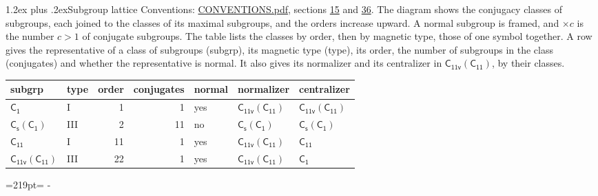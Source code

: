 \documentclass[10pt,a4paper]{article}
\makeatletter
\renewcommand\section{\@startsection{section}{1}{\z@}{-3ex plus -1ex minus -.2ex}%
  {1.2ex plus .2ex}{\normalfont\large\sffamily\bfseries\color{parttitle}}}
\newcommand{\needspace}[1]{\par\penalty-100\begingroup\dimen0=#1\relax\dimen2=\pagegoal
  \advance\dimen2-\pagetotal\ifdim\dimen0>\dimen2\relax\ifdim\dimen2>0pt\vfil\break\fi\fi
  \endgroup}
\numberwithin{equation}{section}
\newcommand{\grp}[1]{\mathsf{#1}}
\newcommand{\nconj}[1]{{\scriptsize$\times#1$}}
\makeatother
\begin{document}
\section{Subgroup lattice}\label{s:subgroups}
Conventions: \href{../../CONVENTIONS.pdf}{CONVENTIONS.pdf}, sections \href{../../../rotation/CONVENTIONS.pdf\#conv.15}{15} and \href{../../CONVENTIONS.pdf\#conv.36}{36}.
The diagram shows the conjugacy classes of subgroups, each joined to the classes of its maximal subgroups, and the orders increase upward. \label{n:index.conjugates.c}\label{n:mark.conjugates}A normal subgroup is framed, and ${\times}c$ is the number $c > 1$ of conjugate subgroups. The table lists the classes by order, then by magnetic type, those of one symbol together. \label{n:head.subgroup}\label{n:head.magnetic.type}\label{n:head.order}\label{n:head.conjugates}\label{n:head.normal}A row gives the representative of a class of subgroups (subgrp), its magnetic type (type), its order, the number of subgroups in the class (conjugates) and whether the representative is normal. \label{n:head.normalizer}\label{n:head.centralizer}It also gives its normalizer and its centralizer in $\grp{C_{11v}}(\grp{C_{11}})$, by their classes. 
\begin{center}
\end{center}
{\small\begin{longtable}{@{}llrrlll@{}}\toprule
subgrp & type & order & conjugates & normal & normalizer & centralizer\\\midrule\endhead
\bottomrule\endfoot\endlastfoot
\href{../../../rotation/data/pdf/C1.pdf}{$\grp{C_{1}}$} & I & 1 & 1 & yes & \href{C11v-C11.pdf}{$\grp{C_{11v}}(\grp{C_{11}})$} & \href{C11v-C11.pdf}{$\grp{C_{11v}}(\grp{C_{11}})$}\\*
\href{C1v-C1.pdf}{$\grp{C_{s}}(\grp{C_{1}})$} & III & 2 & 11 & no & \href{C1v-C1.pdf}{$\grp{C_{s}}(\grp{C_{1}})$} & \href{C1v-C1.pdf}{$\grp{C_{s}}(\grp{C_{1}})$}\\*
\href{../../../rotation/data/pdf/C11.pdf}{$\grp{C_{11}}$} & I & 11 & 1 & yes & \href{C11v-C11.pdf}{$\grp{C_{11v}}(\grp{C_{11}})$} & \href{../../../rotation/data/pdf/C11.pdf}{$\grp{C_{11}}$}\\*
\href{C11v-C11.pdf}{$\grp{C_{11v}}(\grp{C_{11}})$} & III & 22 & 1 & yes & \href{C11v-C11.pdf}{$\grp{C_{11v}}(\grp{C_{11}})$} & \href{../../../rotation/data/pdf/C1.pdf}{$\grp{C_{1}}$}\\
\bottomrule\end{longtable}}
\needspace{219pt}
\end{document}
